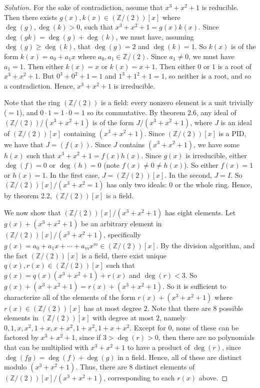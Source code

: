 \documentclass{article}
\newcommand{\Z}{{\mathbb Z}}
\begin{document}
\begin{proof}[Solution]\let\qed\relax
	For the sake of contradiction, assume that $x^3+x^2+1$ is reducible.
	Then there exists $g(x),k(x) \in (\Z/(2))[x]$ where $\deg(g),\deg(k)>0$, such that $x^3 + x^2 + 1 = g(x)k(x)$.
	Since $\deg(gk) = \deg(g) + \deg(k)$, we must have, assuming $\deg(g) \geq \deg(k)$,
	that $\deg(g) = 2$ and $\deg(k) = 1$.
	So $k(x)$ is of the form $k(x) = a_0 + a_1x$ where $a_0,a_1 \in \Z/(2)$.
	Since $a_1 \neq 0$, we must have $a_1 = 1$.
	Then either $k(x) = x$ or $k(x) = x + 1$.
	Then either $0$ or $1$ is a root of $x^3 + x^2 + 1$.
	But $0^3 + 0^2 + 1 = 1$ and $1^3 + 1^2 + 1 = 1$,
	so neither is a root,
	and so a contradiction.
	Hence, $x^3 + x^2 + 1$ is irreducible.

	Note that the ring $(\Z/(2))$ is a field:
	every nonzero element is a unit trivially ($=1$),
	and $0\cdot 1 = 1 \cdot 0 = 1$ so its commutative.
	By theorem 2.6, any ideal of $(\Z/(2))/(x^3 + x^2 + 1)$
	is of the form $J/(x^3 + x^2 + 1)$, where $J$ is an ideal of $(\Z/(2))[x]$
	containing $(x^3 + x^2 + 1)$.
	Since $(\Z/(2))[x]$ is a PID, we have that $J = (f(x))$.
	Since $J$ contains $(x^3+x^2+1)$, we have some $h(x)$ such that
	$x^3 + x^2 + 1 = f(x)h(x)$.
	Since $g(x)$ is irreducible, either $\deg(f) = 0$ or $\deg(h) = 0$
	(note $f(x) \neq 0 \neq h(x)$).
	So either $f(x) = 1$ or $h(x) = 1$.
	In the first case, $J = (\Z/(2))[x]$.
	In the second, $J = I$.
	So $(\Z/(2))[x]/(x^3 + x^2 = 1)$ has only two ideals: $0$ or the whole ring.
	Hence, by theorem 2.2, $(\Z/(2))[x]$ is a field.

	We now show that $(\Z/(2))[x]/(x^3+x^2+1)$ has eight elements.
	Let $g(x) + (x^3 + x^2 + 1)$ be an arbitrary element in $(\Z/(2))[x]/(x^3+x^2+1)$,
	specifically $g(x) = a_0 + a_1x + \cdots + a_mx^m \in (\Z/(2))[x]$.
	By the division algorithm, and the fact $(\Z/(2))[x]$ is a field,
	there exist unique $q(x),r(x) \in (\Z/(2))[x]$ such that
	$g(x) = q(x)(x^3 + x^2 + 1) + r(x)$ and $\deg(r) < 3$.
	So $g(x) + (x^3 + x^2 + 1) = r(x) + (x^3 + x^2 + 1)$.
	So it is sufficient to characterize all of the elements of the form
	$r(x) + (x^3 + x^2 + 1)$ where $r(x) \in (\Z/(2))[x]$ has at most degree $2$.
	Note that there are $8$ possible elements in $(\Z/(2))[x]$
	with degree at most $2$,
	namely $0, 1, x, x^2, 1 + x, x + x^2, 1 + x^2, 1 + x + x^2$.
	Except for $0$, none of these can be factored by $x^3 + x^2 + 1$,
	since if $3 > \deg(r) > 0$, then there are no polynomials
	that can be multiplied with $x^3 + x^2 + 1$ to have a product of $\deg(r)$,
	since $\deg(fg) = \deg(f) + \deg(g)$ in a field.
	Hence, all of these are distinct modulo $(x^3 + x^2 + 1)$.
	Thus, there are $8$ distinct elements of $(\Z/(2))[x]/(x^3 + x^2 + 1)$,
	corresponding to each $r(x)$ above.
\end{proof}
\end{document}
